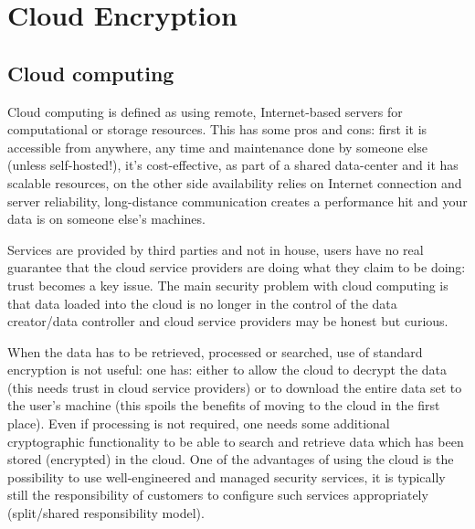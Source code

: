 \chapter{Cloud Encryption}


\section{Cloud computing}
Cloud computing is defined as using remote, Internet-based servers for computational or storage resources. This has some pros and cons: first it is accessible from anywhere, any time and maintenance done by someone else (unless self-hosted!), it's cost-effective, as part of a shared data-center and it has scalable resources, on the other side availability relies on Internet connection and server reliability, long-distance communication creates a performance hit and your data is on someone else’s machines.

Services are provided by third parties and not in house, users have no real guarantee that the cloud service providers are doing what they claim to be doing: trust becomes a key issue. The main security problem with cloud computing is that data loaded into the cloud is no longer in the control of the data creator/data controller and cloud service providers may be honest but curious.

When the data has to be retrieved, processed or searched, use of standard encryption is not useful: one has: either to allow the cloud to decrypt the data (this needs trust in cloud service providers) or to download the entire data set to the user’s machine (this spoils the benefits of moving to the cloud in the first place). Even if processing is not required, one needs some additional cryptographic functionality to be able to search and retrieve data which has been stored (encrypted) in the cloud. One of the advantages of using the cloud is the possibility to use well-engineered and managed security services, it is typically still the responsibility of customers to configure such services appropriately (split/shared responsibility model).

